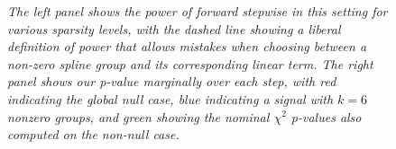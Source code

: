 \documentclass{imsart}
\begin{document}
\begin{figure}
\begin{center}
\hspace{-15pt}
\caption{\small \it The left panel shows the power of forward stepwise
in this setting for various sparsity levels, with the dashed line
showing a liberal definition of power that allows mistakes when
choosing between a non-zero spline group and its corresponding linear
term.
The right panel shows our p-value marginally
over each step, with red indicating the global null case, blue
indicating a signal with $k=6$ nonzero groups, and green showing
the nominal $\chi^2$ p-values also computed on the non-null case.}
\label{fig:spline}
\end{center}
\end{figure}
\end{document}
